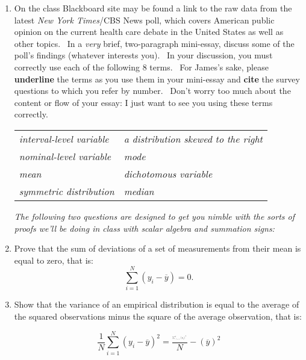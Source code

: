 \documentclass[11pt]{article}
\begin{document}
\begin{enumerate}
\item On the class Blackboard site may be found a link to the raw data from
the latest \textit{New York Times}/CBS News poll, which covers American
public opinion on the current health care debate in the United States as
well as other topics. \ In a \textit{very} brief, two-paragraph mini-essay,
discuss some of the poll's findings (whatever interests you). \ In your
discussion, you must correctly use each of the following 8 terms. \ For
James's sake, please \textbf{underline} the terms as you use them in your
mini-essay and \textbf{cite }the survey questions to which you refer by
number. \ Don't worry too much about the content or flow of your essay: I
just want to see you using these terms correctly.

\qquad \qquad \qquad \qquad \qquad \qquad 
\begin{tabular}{ll}
\textit{interval-level variable} & \textit{a distribution skewed to the right%
} \\ 
\textit{nominal-level variable} & \textit{mode} \\ 
\textit{mean} & \textit{dichotomous variable} \\ 
\textit{symmetric distribution} & \textit{median}%
\end{tabular}

\bigskip 

\textit{The following two questions are designed to get you nimble with the
sorts of proofs we'll be doing in class with scalar algebra and summation
signs:}\bigskip 

\item Prove that the sum of deviations of a set of measurements from their
mean is equal to zero, that is:%
\begin{equation*}
\underset{i=1}{\overset{N}{\sum }}\left( y_{i}-\overline{y}\right) =0.
\end{equation*}%
\bigskip 

\item Show that the variance of an empirical distribution is equal to the
average of the squared observations minus the square of the average
observation, that is:

\begin{equation*}
\frac{1}{N}\underset{i=1}{\overset{N}{\sum }}\left( y_{i}-\overline{y}%
\right) ^{2}=\frac{_{_{^{^{\underset{i=1}{\overset{N}{\sum }}\left(
y_{i}\right) ^{2}}}}}}{N}-\left( \overline{y}\right) ^{2}
\end{equation*}%
\bigskip 


\end{enumerate}
\end{document}
